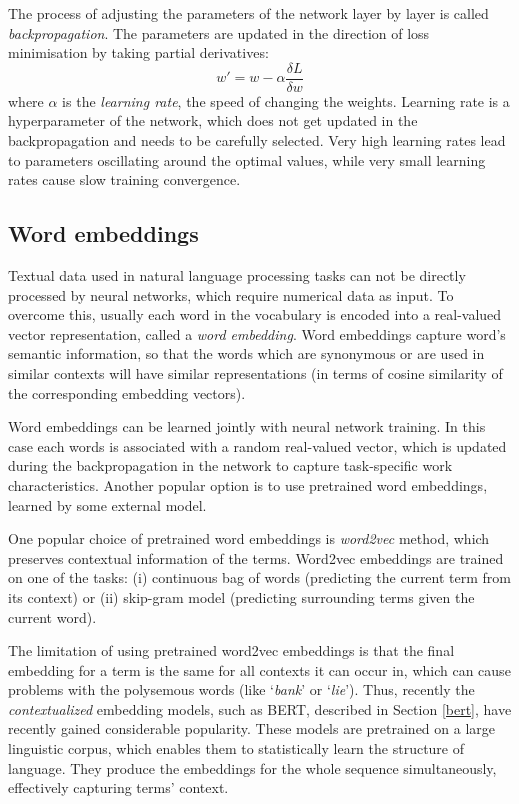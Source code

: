 The process of adjusting the parameters of the network layer by layer is called \textit{backpropagation}. The parameters are updated in the direction of loss minimisation by taking partial derivatives:
\begin{equation}
    w' = w - \alpha\frac{\delta L}{\delta w}
\end{equation}
where $\alpha$ is the \textit{learning rate}, the speed of changing the weights. Learning rate is a hyperparameter of the network, which does not get updated in the backpropagation and needs to be carefully selected. Very high learning rates lead to parameters oscillating around the optimal values, while very small learning rates cause slow training convergence.

\subsection{Word embeddings}

Textual data used in natural language processing tasks can not be directly processed by neural networks, which require numerical data as input. To overcome this, usually each word in the vocabulary is encoded into a real-valued vector representation, called a \textit{word embedding}. Word embeddings capture word's semantic information, so that the words which are synonymous or are used in similar contexts will have similar representations (in terms of cosine similarity of the corresponding embedding vectors).

Word embeddings can be learned jointly with neural network training. In this case each words is associated with a random real-valued vector, which is updated during the backpropagation in the network to capture task-specific work characteristics. Another popular option is to use pretrained word embeddings, learned by some external model.

One popular choice of pretrained word embeddings is \textit{word2vec} \cite{mikolov2013efficient} method, which preserves contextual information of the terms. Word2vec embeddings are trained on one of the tasks: (i) continuous bag of words (predicting the current term from its context) or (ii) skip-gram model (predicting surrounding terms given the current word). 

The limitation of using pretrained word2vec embeddings is that the final embedding for a term is the same for all contexts it can occur in, which can cause problems with the polysemous words (like `\textit{bank}' or `\textit{lie}'). Thus, recently the \textit{contextualized} embedding models, such as BERT, described in Section \ref{bert}, have recently gained considerable popularity. These models are pretrained on a large linguistic corpus, which enables them to statistically learn the structure of language. They produce the embeddings for the whole sequence simultaneously, effectively capturing terms' context. 

